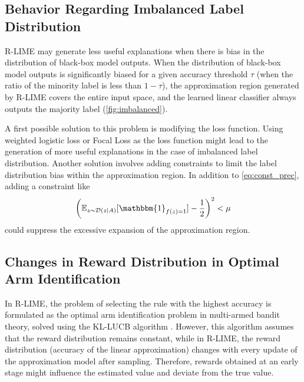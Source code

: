 \documentclass[runningheads]{llncs}
\begin{document}
\subsection{Behavior Regarding Imbalanced Label Distribution}
R-LIME may generate less useful explanations
when there is bias in the distribution of black-box model outputs.
When the distribution of black-box model outputs is significantly biased
for a given accuracy threshold $\tau$
(when the ratio of the minority label is less than $1-\tau$),
the approximation region generated by R-LIME covers the entire input space,
and the learned linear classifier always outputs the majority label
(\cref{fig:imbalanced}).

A first possible solution to this problem is modifying the loss function.
Using weighted logistic loss or Focal Loss \cite{lin2020focal}
as the loss function might lead to the generation of more useful explanations
in the case of imbalanced label distribution.
Another solution involves adding constraints
to limit the label distribution bias within the approximation region.
In addition to \cref{eq:const_prec}, adding a constraint like
\begin{equation}
  {\left(\mathbb{E}_{z\sim\mathcal{D}(z\mid A)}[\mathbbm{1}_{f(z)=1}]-\frac{1}{2}\right)}^2<\mu
\end{equation}
could suppress the excessive expansion of the approximation region.

\subsection{Changes in Reward Distribution in Optimal Arm Identification}\label{sec:reward}
{%
  \renewcommand{\arraystretch}{1.1}
  \begin{table}[tbp]
    \centering
    \caption{%
      Deviation between the estimated accuracy and the true accuracy.
      Deviation was relatively small considering confidence level $1-\delta=0.95$.
    }\label{tab:reward}
    
  \end{table}
}
In R-LIME,
the problem of selecting the rule with the highest accuracy is formulated
as the optimal arm identification problem in multi-armed bandit theory,
solved using the KL-LUCB algorithm \cite{kaufmann2013information}.
However, this algorithm assumes that the reward distribution remains constant,
while in R-LIME,
the reward distribution (accuracy of the linear approximation)
changes with every update of the approximation model after sampling.
Therefore, rewards obtained at an early stage
might influence the estimated value and deviate from the true value.
\end{document}
